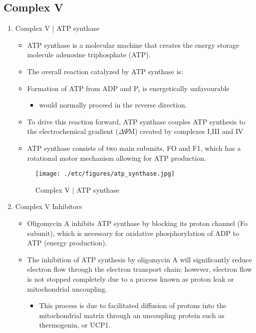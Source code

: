 \documentclass{scrartcl}
\begin{document}
\subsection{Complex V}
\label{sec:orgf14ab11}
\begin{enumerate}
\item Complex V | ATP synthase
\label{sec:org657d8d1}

\begin{itemize}
\item ATP synthase is a molecular machine that creates the energy storage
molecule adenosine triphosphate (ATP).

\item The overall reaction catalyzed by ATP synthase is:
\end{itemize}

{\small{}}


\begin{itemize}
\item Formation of ATP from ADP and P\(_{\text{i}}\) is energetically unfavourable
\begin{itemize}
\item would normally proceed in the reverse direction.
\end{itemize}

\item To drive this reaction forward, ATP synthase couples ATP synthesis
to the electrochemical gradient (\(\Delta \Psi\)M) created by complexes
I,III and IV

\item ATP synthase consists of two main subunits, FO and F1, which has a
rotational motor mechanism allowing for ATP production.
\end{itemize}

\begin{figure}[htbp]
\centering
\texttt{[image: ./etc/figures/atp\_synthase.jpg]}
\caption{\label{fig:org8decc63}
Complex V | ATP synthase}
\end{figure}


{\small{}}

\item Complex V Inhibitors
\label{sec:orga7d8db3}
\begin{itemize}
\item Oligomycin A inhibits ATP synthase by blocking its proton channel
(Fo subunit), which is necessary for oxidative phosphorylation of
ADP to ATP (energy production).
\item The inhibition of ATP synthesis by oligomycin A will significantly
reduce electron flow through the electron transport chain; however,
electron flow is not stopped completely due to a process known as
proton leak or mitochondrial uncoupling.
\begin{itemize}
\item This process is due to facilitated diffusion of protons into the
mitochondrial matrix through an uncoupling protein such as
thermogenin, or UCP1.
\end{itemize}


\end{itemize}
\end{enumerate}
\end{document}
